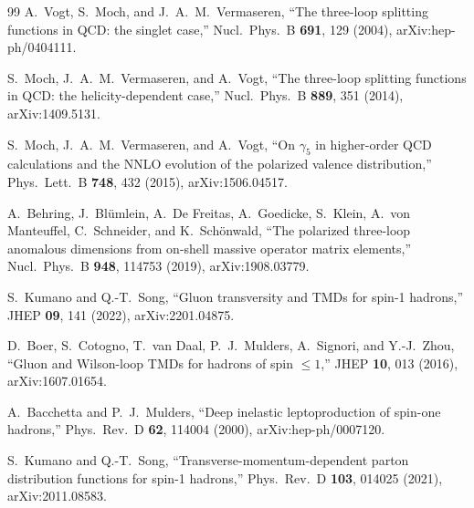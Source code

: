 \documentclass[11pt]{article}
\begin{document}
\begin{thebibliography}{99}
A.~Vogt, S.~Moch, and J.~A.~M.~Vermaseren,
``The three-loop splitting functions in QCD: the singlet case,''
Nucl.\ Phys.\ B \textbf{691}, 129 (2004), arXiv:hep-ph/0404111.

S.~Moch, J.~A.~M.~Vermaseren, and A.~Vogt,
``The three-loop splitting functions in QCD: the helicity-dependent case,''
Nucl.\ Phys.\ B \textbf{889}, 351 (2014), arXiv:1409.5131.

S.~Moch, J.~A.~M.~Vermaseren, and A.~Vogt,
``On \(\gamma_5\) in higher-order QCD calculations and the NNLO evolution of the polarized valence distribution,''
Phys.\ Lett.\ B \textbf{748}, 432 (2015), arXiv:1506.04517.

A.~Behring, J.~Bl\"umlein, A.~De Freitas, A.~Goedicke, S.~Klein,
A.~von Manteuffel, C.~Schneider, and K.~Sch\"onwald,
``The polarized three-loop anomalous dimensions from on-shell massive operator matrix elements,''
Nucl.\ Phys.\ B \textbf{948}, 114753 (2019), arXiv:1908.03779.

S.~Kumano and Q.-T.~Song,
``Gluon transversity and TMDs for spin-1 hadrons,''
JHEP \textbf{09}, 141 (2022), arXiv:2201.04875.

D.~Boer, S.~Cotogno, T.~van Daal, P.~J.~Mulders, A.~Signori, and Y.-J.~Zhou,
``Gluon and Wilson-loop TMDs for hadrons of spin \(\leq1\),''
JHEP \textbf{10}, 013 (2016), arXiv:1607.01654.

A.~Bacchetta and P.~J.~Mulders,
``Deep inelastic leptoproduction of spin-one hadrons,''
Phys.\ Rev.\ D \textbf{62}, 114004 (2000), arXiv:hep-ph/0007120.

S.~Kumano and Q.-T.~Song,
``Transverse-momentum-dependent parton distribution functions for spin-1 hadrons,''
Phys.\ Rev.\ D \textbf{103}, 014025 (2021), arXiv:2011.08583.

\end{thebibliography}
\end{document}
